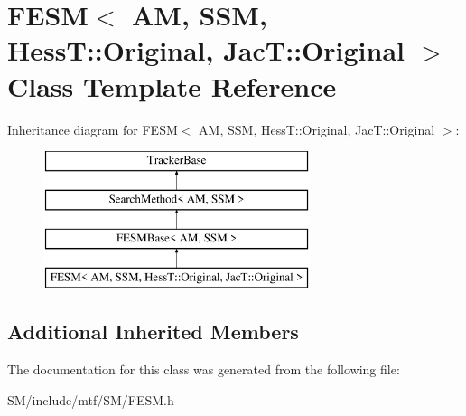 \hypertarget{classFESM_3_01AM_00_01SSM_00_01HessT_1_1Original_00_01JacT_1_1Original_01_4}{\section{F\-E\-S\-M$<$ A\-M, S\-S\-M, Hess\-T\-:\-:Original, Jac\-T\-:\-:Original $>$ Class Template Reference}
\label{classFESM_3_01AM_00_01SSM_00_01HessT_1_1Original_00_01JacT_1_1Original_01_4}
}
Inheritance diagram for F\-E\-S\-M$<$ A\-M, S\-S\-M, Hess\-T\-:\-:Original, Jac\-T\-:\-:Original $>$\-:\begin{figure}[H]
\begin{center}
\leavevmode
\includegraphics[height=4.000000cm]{classFESM_3_01AM_00_01SSM_00_01HessT_1_1Original_00_01JacT_1_1Original_01_4}
\end{center}
\end{figure}
\subsection*{Additional Inherited Members}


The documentation for this class was generated from the following file\-:\begin{DoxyCompactItemize}
\item 
S\-M/include/mtf/\-S\-M/F\-E\-S\-M.\-h\end{DoxyCompactItemize}
